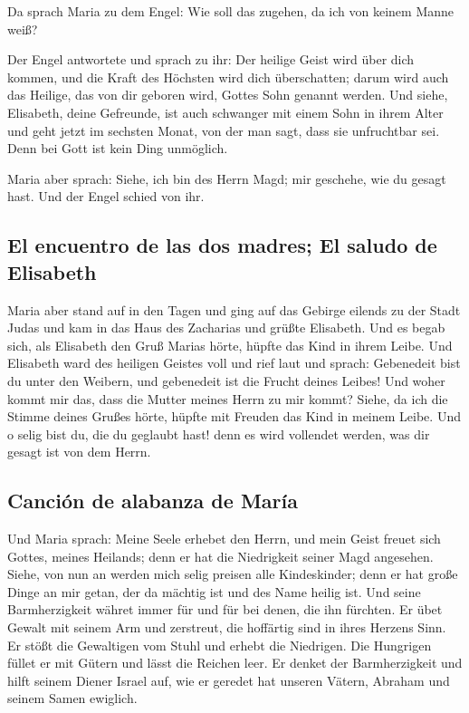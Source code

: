  Da sprach Maria zu dem Engel: Wie soll das zugehen, da
ich von keinem Manne weiß?

 Der Engel antwortete und sprach zu ihr: Der heilige
Geist wird über dich kommen, und die Kraft des Höchsten wird dich
überschatten; darum wird auch das Heilige, das von dir geboren wird,
Gottes Sohn genannt werden.  Und siehe, Elisabeth, deine
Gefreunde, ist auch schwanger mit einem Sohn in ihrem Alter und geht
jetzt im sechsten Monat, von der man sagt, dass sie unfruchtbar sei.
 Denn bei Gott ist kein Ding unmöglich.

 Maria aber sprach: Siehe, ich bin des Herrn Magd; mir
geschehe, wie du gesagt hast. Und der Engel schied von ihr.

\hypertarget{el-encuentro-de-las-dos-madres-el-saludo-de-elisabeth}{%
\subsection{El encuentro de las dos madres; El saludo de
Elisabeth}\label{el-encuentro-de-las-dos-madres-el-saludo-de-elisabeth}}

 Maria aber stand auf in den Tagen und ging auf das
Gebirge eilends zu der Stadt Judas  und kam in das Haus
des Zacharias und grüßte Elisabeth.  Und es begab sich,
als Elisabeth den Gruß Marias hörte, hüpfte das Kind in ihrem Leibe. Und
Elisabeth ward des heiligen Geistes voll  und rief laut
und sprach: Gebenedeit bist du unter den Weibern, und gebenedeit ist die
Frucht deines Leibes!  Und woher kommt mir das, dass die
Mutter meines Herrn zu mir kommt?  Siehe, da ich die
Stimme deines Grußes hörte, hüpfte mit Freuden das Kind in meinem Leibe.
 Und o selig bist du, die du geglaubt hast! denn es wird
vollendet werden, was dir gesagt ist von dem Herrn.

\hypertarget{canciuxf3n-de-alabanza-de-maruxeda}{%
\subsection{Canción de alabanza de
María}\label{canciuxf3n-de-alabanza-de-maruxeda}}

 Und Maria sprach: Meine Seele erhebet den Herrn,
 und mein Geist freuet sich Gottes, meines Heilands;
 denn er hat die Niedrigkeit seiner Magd angesehen.
Siehe, von nun an werden mich selig preisen alle Kindeskinder;
 denn er hat große Dinge an mir getan, der da mächtig ist
und des Name heilig ist.  Und seine Barmherzigkeit währet
immer für und für bei denen, die ihn fürchten.  Er übet
Gewalt mit seinem Arm und zerstreut, die hoffärtig sind in ihres Herzens
Sinn.  Er stößt die Gewaltigen vom Stuhl und erhebt die
Niedrigen.  Die Hungrigen füllet er mit Gütern und lässt
die Reichen leer.  Er denket der Barmherzigkeit und hilft
seinem Diener Israel auf,  wie er geredet hat unseren
Vätern, Abraham und seinem Samen ewiglich.

